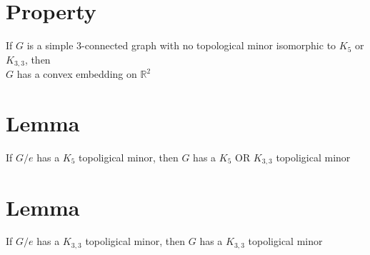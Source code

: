     \section{Property}
        If $G$ is a simple 3-connected graph with no topological minor isomorphic to $K_5$ or $K_{3, 3}$, then\\
        $G$ has a convex embedding on $\mathbb{R}^2$
    \section{Lemma}
        If $G/e$ has a $K_5$ topoligical minor, then $G$ has a $K_5$ OR $K_{3, 3}$ topoligical minor
    \section{Lemma}
        If $G/e$ has a $K_{3, 3}$ topoligical minor, then $G$ has a $K_{3, 3}$ topoligical minor
